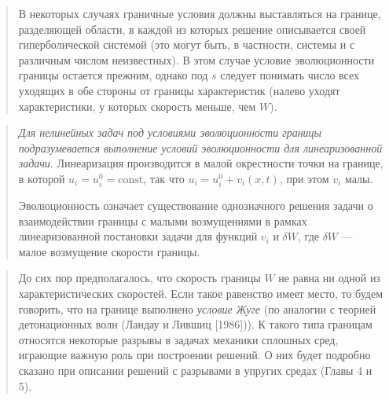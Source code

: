 \documentclass[12pt,a4paper]{article}
\begin{document}
\begin{quote}\sloppy
В некоторых случаях граничные условия должны выставляться на границе, разделяющей области, в каждой из которых решение описывается своей гиперболической системой (это могут быть, в частности, системы и с различным числом неизвестных). В этом случае условие эволюционности границы остается прежним, однако под $s$ следует понимать число всех уходящих в обе стороны от границы характеристик (налево уходят характеристики, у которых скорость меньше, чем $W$).
\par\nobreak{}\par
\end{quote}

\begin{quote}\sloppy
\textit{Для нелинейных задач под условиями эволюционности границы подразумевается выполнение условий эволюционности для линеаризованной задачи}. Линеаризация производится в малой окрестности точки на границе, в которой $u_i=u_i^0=\mathrm{const}$, так что $u_i=u_i^0+v_i(x,t)$, при этом $v_i$ малы.

Эволюционность означает существование однозначного решения задачи о взаимодействии границы с малыми возмущениями в рамках линеаризованной постановки задачи для функций $v_i$ и $\delta W$, где $\delta W$ --- малое возмущение скорости границы.
\par\nobreak{}\par
\end{quote}

\begin{quote}\sloppy
До сих пор предполагалось, что скорость границы $W$ не равна ни одной из характеристических скоростей. Если такое равенство имеет место, то будем говорить, что на границе выполнено \textit{условие Жуге} (по аналогии с теорией детонационных волн (Ландау и Лившиц [1986])). К такого типа границам относятся некоторые разрывы в задачах механики сплошных сред, играющие важную роль при построении решений. О них будет подробно сказано при описании решений с разрывами в упругих средах (Главы 4 и 5).
\par\nobreak{}\par
\end{quote}
\end{document}
